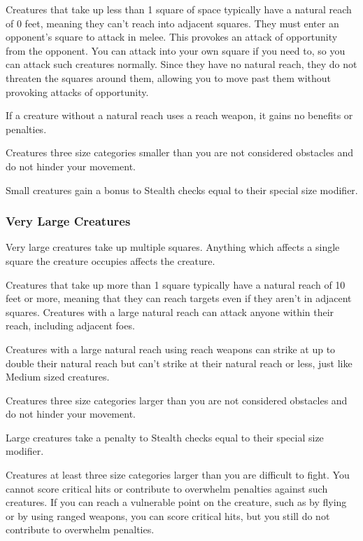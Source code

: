  Creatures that take up less than 1 square of space typically have a natural reach of 0 feet, meaning they can't reach into adjacent squares. They must enter an opponent's square to attack in melee. This provokes an attack of opportunity from the opponent. You can attack into your own square if you need to, so you can attack such creatures normally. Since they have no natural reach, they do not threaten the squares around them, allowing you to move past them without provoking attacks of opportunity.

If a creature without a natural reach uses a reach weapon, it gains no benefits or penalties.

 Creatures three size categories smaller than you are not considered obstacles and do not hinder your movement.

 Small creatures gain a bonus to Stealth checks equal to their special size modifier.

\subsubsection{Very Large Creatures}
 Very large creatures take up multiple squares. Anything which affects a single square the creature occupies affects the creature. 

 Creatures that take up more than 1 square typically have a natural reach of 10 feet or more, meaning that they can reach targets even if they aren't in adjacent squares. Creatures with a large natural reach can attack anyone within their reach, including adjacent foes.

Creatures with a large natural reach using reach weapons can strike at up to double their natural reach but can't strike at their natural reach or less, just like Medium sized creatures.

 Creatures three size categories larger than you are not considered obstacles and do not hinder your movement.

 Large creatures take a penalty to Stealth checks equal to their special size modifier.

 Creatures at least three size categories larger than you are difficult to fight. You cannot score critical hits or contribute to overwhelm penalties against such creatures. If you can reach a vulnerable point on the creature, such as by flying or by using ranged weapons, you can score critical hits, but you still do not contribute to overwhelm penalties.

